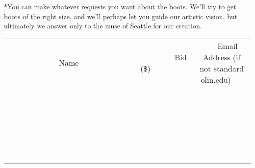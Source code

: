 \documentclass[11pt]{article}
\begin{document}
*You can make whatever requests you want about the boots. We'll try to get boots of the right size, and we'll perhaps let you guide our artistic vision, but ultimately we answer only to the muse of Seattle for our creation.
\\[6ex]
\begin{tabular}{c c c}
~~~~~~~~~~~~~Name~~~~~~~~~~~~~ & ~~~~~~~~~Bid (\$)~~~~~~~~~  & ~~~Email Address (if not standard olin.edu)~~~\\
 & & \\
\hline
 & & \\
\hline
 & & \\
\hline
 & & \\
\hline
 & & \\
\hline
 & & \\
\hline
 & & \\
\hline
 & & \\
\hline
 & & \\
\hline
 & & \\
\hline
 & & \\
\hline
 & & \\
\hline
 & & \\
\hline
 & & \\
\hline
 & & \\
\hline
 & & \\
\hline
 & & \\
\hline
 & & \\
\hline
 & & \\
\hline
 & & \\
\hline
 & & \\
\hline
 & & \\
\hline
 & & \\
\hline
 & & \\
\hline
 & & \\
\hline
 & & \\
\hline
\end{tabular}
\newpage
\end{document}
